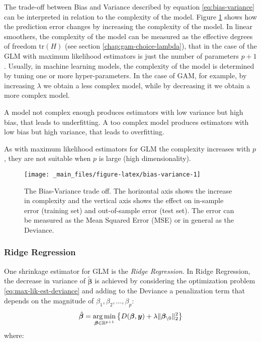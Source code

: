 \documentclass[a4paper, nobind]{templates/ociamthesis}
\theoremstyle{definition}
\theoremstyle{definition}
\theoremstyle{definition}
\theoremstyle{remark}
\begin{document}
The trade-off between Bias and Variance described by equation \eqref{eq:bias-variance} can be interpreted in relation to the complexity of the model. Figure \ref{fig:bias-variance} shows how the prediction error changes by increasing the complexity of the model. In linear smoothers, the complexity of the model can be measured as the effective degrees of freedom \(\text{tr}(H)\) (see section \ref{chap:gam-choice-lambda}), that in the case of the GLM with maximum likelihood estimators is just the number of parameters \(p+1\). Usually, in machine learning models, the complexity of the model is determined by tuning one or more hyper-parameters. In the case of GAM, for example, by increasing \(\lambda\) we obtain a less complex model, while by decreasing it we obtain a more complex model.

A model not complex enough produces estimators with low variance but high bias, that leads to underfitting. A too complex model produces estimators with low bias but high variance, that leads to overfitting.

As with maximum likelihood estimators for GLM the complexity increases with \(p\), they are not suitable when \(p\) is large (high dimensionality).





\begin{figure}[!hbtp]

{\centering \texttt{[image: \_main\_files/figure-latex/bias-variance-1]} 

}

\caption[The Bias-Variance trade off.]{The Bias-Variance trade off. The horizontal axis shows the increase in complexity and the vertical axis shows the effect on in-sample error (training set) and out-of-sample error (test set). The error can be measured as the Mean Squared Error (MSE) or in general as the Deviance.}\label{fig:bias-variance}
\end{figure}

\hypertarget{ridge-regression}{%
\subsubsection{Ridge Regression}\label{ridge-regression}}

One shrinkage estimator for GLM is the \emph{Ridge Regression}. In Ridge Regression, the decrease in variance of \(\tilde{\boldsymbol{\beta}}\) is achieved by considering the optimization problem \eqref{eq:max-lik-est-deviance} and adding to the Deviance a penalization term that depends on the magnitude of \(\beta_1, \beta_2, \dots, \beta_p\):
\begin{equation}
\label{eq:ridge-est-deviance}
\hat{\boldsymbol{\beta}} = \operatorname*{arg\,min}_{\boldsymbol{\beta}\in\mathbb{R}^{p+1}}{\left\{D(\boldsymbol{\beta}, \boldsymbol{y}) + \lambda \|\boldsymbol{\beta}_{\setminus0}\|_2^2\right\}}
\end{equation}
where:
\end{document}
